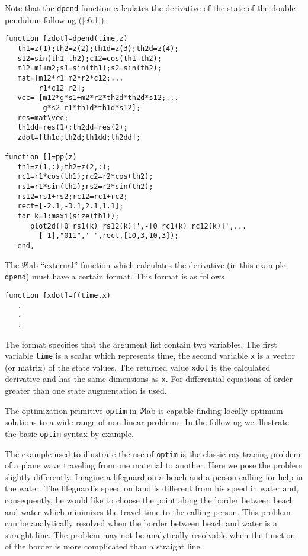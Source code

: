 

Note that the {\tt dpend} function calculates the derivative of
the state of the double pendulum following (\ref{e6.1}).

\begin{verbatim}
function [zdot]=dpend(time,z)
   th1=z(1);th2=z(2);th1d=z(3);th2d=z(4);
   s12=sin(th1-th2);c12=cos(th1-th2);
   m12=m1+m2;s1=sin(th1);s2=sin(th2);
   mat=[m12*r1 m2*r2*c12;...
        r1*c12 r2];
   vec=-[m12*g*s1+m2*r2*th2d*th2d*s12;...
         g*s2-r1*th1d*th1d*s12];
   res=mat\vec;
   th1dd=res(1);th2dd=res(2);
   zdot=[th1d;th2d;th1dd;th2dd];

function []=pp(z)
   th1=z(1,:);th2=z(2,:);
   rc1=r1*cos(th1);rc2=r2*cos(th2);
   rs1=r1*sin(th1);rs2=r2*sin(th2);
   rs12=rs1+rs2;rc12=rc1+rc2;
   rect=[-2.1,-3.1,2.1,1.1];
   for k=1:maxi(size(th1));
      plot2d([0 rs1(k) rs12(k)]',-[0 rc1(k) rc12(k)]',...
		[-1],"011",' ',rect,[10,3,10,3]);
   end,

\end{verbatim}

	The $\Psi$lab ``external'' function which calculates the derivative
(in this example {\tt dpend}) must have a certain format.
This format is as follows
\begin{verbatim}
function [xdot]=f(time,x)
   .
   .
   .
\end{verbatim}
The format specifies that the argument list contain two variables.
The first variable {\tt time} is a scalar which represents time, the second
variable {\tt x} is a vector (or matrix) of the state values.  The returned
value {\tt xdot} is the calculated derivative and has the same dimensions
as {\tt x}.  For differential equations of order greater than one
state augmentation is used. 

The optimization primitive 
{\tt optim} in $\Psi$lab
is capable finding locally optimum solutions to a wide range
of non-linear problems.  In the following we illustrate 
the basic {\tt optim} syntax by example. 

	The example used to illustrate the use of {\tt optim} is
the classic ray-tracing problem of a plane wave traveling from
one material to another.  Here we pose the problem slightly differently.
Imagine a lifeguard on a beach and a person calling for help 
in the water.  The lifeguard's speed on land is different from
his speed in water and, consequently, he would like to choose the
point along the border between beach and water which minimizes
the travel time to the calling person.  This problem can be analytically
resolved when the border between beach and water is a straight
line.  The problem may not be analytically resolvable when the function
of the border is more complicated than a straight line.

